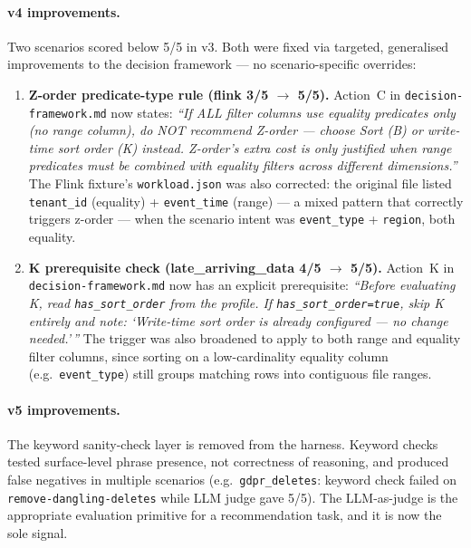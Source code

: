 \documentclass[11pt,a4paper]{article}
\newcommand{\code}[1]{\texttt{#1}}
\begin{document}
\paragraph{v4 improvements.}

Two scenarios scored below 5/5 in v3.  Both were fixed via targeted, generalised
improvements to the decision framework --- no scenario-specific overrides:

\begin{enumerate}
  \item \textbf{Z-order predicate-type rule (flink 3/5 $\to$ 5/5).}
        Action~C in \code{decision-framework.md} now states:
        \emph{``If ALL filter columns use equality predicates only (no range
        column), do NOT recommend Z-order --- choose Sort (B) or write-time
        sort order (K) instead.  Z-order's extra cost is only justified when
        range predicates must be combined with equality filters across different
        dimensions.''}
        The Flink fixture's \code{workload.json} was also corrected: the
        original file listed \code{tenant\_id} (equality) + \code{event\_time}
        (range) --- a mixed pattern that correctly triggers z-order --- when the
        scenario intent was \code{event\_type} + \code{region}, both equality.

  \item \textbf{K prerequisite check (late\_arriving\_data 4/5 $\to$ 5/5).}
        Action~K in \code{decision-framework.md} now has an explicit prerequisite:
        \emph{``Before evaluating K, read \code{has\_sort\_order} from the
        profile. If \code{has\_sort\_order=true}, skip K entirely and note:
        `Write-time sort order is already configured --- no change needed.'\,''}
        The trigger was also broadened to apply to both range and equality filter
        columns, since sorting on a low-cardinality equality column
        (e.g.\ \code{event\_type}) still groups matching rows into contiguous
        file ranges.
\end{enumerate}

\paragraph{v5 improvements.}
The keyword sanity-check layer is removed from the harness.  Keyword checks
tested surface-level phrase presence, not correctness of reasoning, and
produced false negatives in multiple scenarios (e.g.\ \code{gdpr\_deletes}:
keyword check failed on \code{remove-dangling-deletes} while LLM judge gave
5/5).  The LLM-as-judge is the appropriate evaluation primitive for a
recommendation task, and it is now the sole signal.
\end{document}

